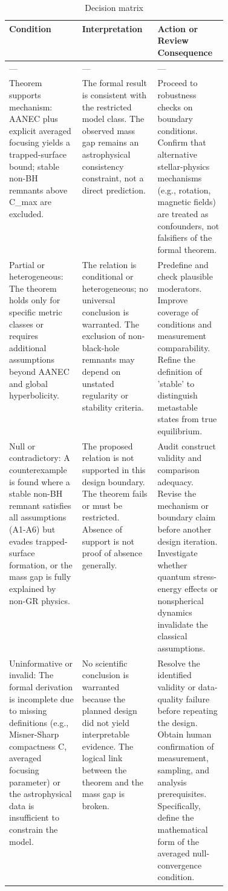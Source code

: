 \documentclass[conference]{IEEEtran}
\begin{document}
\begin{table}[htbp]
\centering
\small
\caption{Decision matrix}
\label{tab:expected-outcomes-block-2}
\begin{tabular}{|p{0.14\linewidth}|p{0.14\linewidth}|p{0.14\linewidth}|}
\hline
Condition & Interpretation & Action or Review Consequence \\\hline
--- & --- & --- \\\hline
Theorem supports mechanism: AANEC plus explicit averaged focusing yields a trapped-surface bound; stable non-BH remnants above C\_max are excluded. & The formal result is consistent with the restricted model class. The observed mass gap remains an astrophysical consistency constraint, not a direct prediction. & Proceed to robustness checks on boundary conditions. Confirm that alternative stellar-physics mechanisms (e.g., rotation, magnetic fields) are treated as confounders, not falsifiers of the formal theorem. \\\hline
Partial or heterogeneous: The theorem holds only for specific metric classes or requires additional assumptions beyond AANEC and global hyperbolicity. & The relation is conditional or heterogeneous; no universal conclusion is warranted. The exclusion of non-black-hole remnants may depend on unstated regularity or stability criteria. & Predefine and check plausible moderators. Improve coverage of conditions and measurement comparability. Refine the definition of 'stable' to distinguish metastable states from true equilibrium. \\\hline
Null or contradictory: A counterexample is found where a stable non-BH remnant satisfies all assumptions (A1-A6) but evades trapped-surface formation, or the mass gap is fully explained by non-GR physics. & The proposed relation is not supported in this design boundary. The theorem fails or must be restricted. Absence of support is not proof of absence generally. & Audit construct validity and comparison adequacy. Revise the mechanism or boundary claim before another design iteration. Investigate whether quantum stress-energy effects or nonspherical dynamics invalidate the classical assumptions. \\\hline
Uninformative or invalid: The formal derivation is incomplete due to missing definitions (e.g., Misner-Sharp compactness C, averaged focusing parameter) or the astrophysical data is insufficient to constrain the model. & No scientific conclusion is warranted because the planned design did not yield interpretable evidence. The logical link between the theorem and the mass gap is broken. & Resolve the identified validity or data-quality failure before repeating the design. Obtain human confirmation of measurement, sampling, and analysis prerequisites. Specifically, define the mathematical form of the averaged null-convergence condition. \\\hline
\end{tabular}
\end{table}
\end{document}
